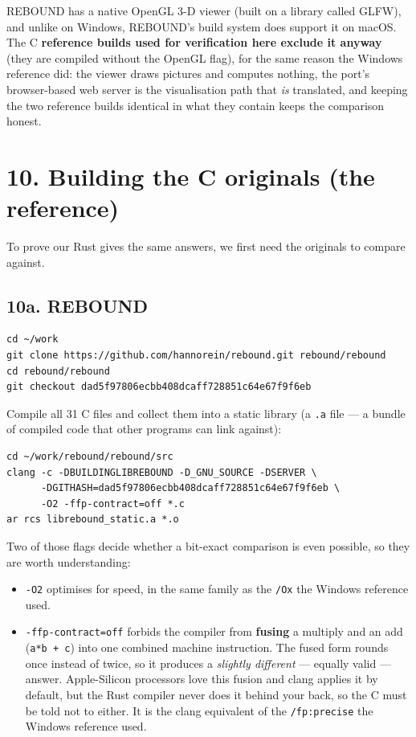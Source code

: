 \documentclass[11pt]{article}
\begin{document}
REBOUND has a native OpenGL 3-D viewer (built on a library called GLFW), and unlike on Windows, REBOUND's build system does support it on macOS. The C \textbf{reference builds used for verification here exclude it anyway} (they are compiled without the OpenGL flag), for the same reason the Windows reference did: the viewer draws pictures and computes nothing, the port's browser-based web server is the visualisation path that \emph{is} translated, and keeping the two reference builds identical in what they contain keeps the comparison honest.

\section{10. Building the C originals (the reference)}

To prove our Rust gives the same answers, we first need the originals to compare against.

\subsection{10a. REBOUND}

\begin{lstlisting}
cd ~/work
git clone https://github.com/hannorein/rebound.git rebound/rebound
cd rebound/rebound
git checkout dad5f97806ecbb408dcaff728851c64e67f9f6eb
\end{lstlisting}

Compile all 31 C files and collect them into a static library (a \texttt{.a} file --- a bundle of compiled code that other programs can link against):

\begin{lstlisting}
cd ~/work/rebound/rebound/src
clang -c -DBUILDINGLIBREBOUND -D_GNU_SOURCE -DSERVER \
      -DGITHASH=dad5f97806ecbb408dcaff728851c64e67f9f6eb \
      -O2 -ffp-contract=off *.c
ar rcs librebound_static.a *.o
\end{lstlisting}

Two of those flags decide whether a bit-exact comparison is even possible, so they are worth understanding:

\begin{itemize}
\item \texttt{-O2} optimises for speed, in the same family as the \texttt{/Ox} the Windows reference used.
\item \texttt{-ffp-contract=off} forbids the compiler from \textbf{fusing} a multiply and an add (\texttt{a*b + c}) into one combined machine instruction. The fused form rounds once instead of twice, so it produces a \emph{slightly different} --- equally valid --- answer. Apple-Silicon processors love this fusion and clang applies it by default, but the Rust compiler never does it behind your back, so the C must be told not to either. It is the clang equivalent of the \texttt{/fp:precise} the Windows reference used.
\end{itemize}
\end{document}
